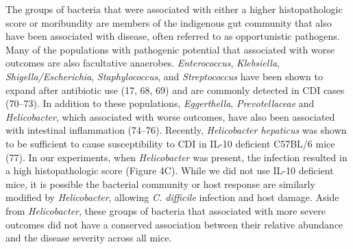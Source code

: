 \documentclass[
  12pt,
]{article}
\begin{document}
The groups of bacteria that were associated with either a higher
histopathologic score or moribundity are members of the indigenous gut
community that also have been associated with disease, often referred to
as opportunistic pathogens. Many of the populations with pathogenic
potential that associated with worse outcomes are also facultative
anaerobes. \emph{Enterococcus}, \emph{Klebsiella},
\emph{Shigella/Escherichia}, \emph{Staphylococcus}, and
\emph{Streptococcus} have been shown to expand after antibiotic use (17,
68, 69) and are commonly detected in CDI cases (70--73). In addition to
these populations, \emph{Eggerthella}, \emph{Prevotellaceae} and
\emph{Helicobacter}, which associated with worse outcomes, have also
been associated with intestinal inflammation (74--76). Recently,
\emph{Helicobacter hepaticus} was shown to be sufficient to cause
susceptibility to CDI in IL-10 deficient C57BL/6 mice (77). In our
experiments, when \emph{Helicobacter} was present, the infection
resulted in a high histopathologic score (Figure 4C). While we did not
use IL-10 deficient mice, it is possible the bacterial community or host
response are similarly modified by \emph{Helicobacter}, allowing
\emph{C. difficile} infection and host damage. Aside from
\emph{Helicobacter}, these groups of bacteria that associated with more
severe outcomes did not have a conserved association between their
relative abundance and the disease severity across all mice.
\end{document}
